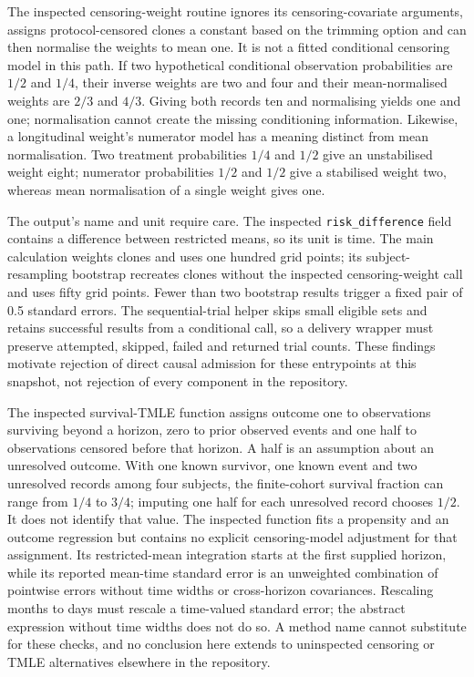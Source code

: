 The inspected censoring-weight routine ignores its censoring-covariate arguments,
assigns protocol-censored clones a constant based on the trimming option and can
then normalise the weights to mean one. It is not a fitted conditional censoring
model in this path. If two hypothetical conditional observation probabilities are
$1/2$ and $1/4$, their inverse weights are two and four and their mean-normalised
weights are $2/3$ and $4/3$. Giving both records ten and normalising yields one
and one; normalisation cannot create the missing conditioning information.
Likewise, a longitudinal weight's numerator model has a meaning distinct from mean
normalisation. Two treatment probabilities $1/4$ and $1/2$ give an unstabilised
weight eight; numerator probabilities $1/2$ and $1/2$ give a stabilised weight two,
whereas mean normalisation of a single weight gives one.
\citep{exec24_survivalother_rustcore,exec24_survivalother_reference}

The output's name and unit require care. The inspected
\texttt{risk\_difference} field contains a difference between restricted means,
so its unit is time. The main calculation weights clones and uses one hundred
grid points; its subject-resampling bootstrap recreates clones without the inspected
censoring-weight call and uses fifty grid points. Fewer than two bootstrap results
trigger a fixed pair of 0.5 standard errors. The sequential-trial helper skips
small eligible sets and retains successful results from a conditional call, so a
delivery wrapper must preserve attempted, skipped, failed and returned trial counts.
These findings motivate rejection of direct causal admission for these entrypoints
at this snapshot, not rejection of every component in the repository.
\citep{exec24_survivalother_rustcore}

The inspected survival-TMLE function assigns outcome one to observations surviving
beyond a horizon, zero to prior observed events and one half to observations censored
before that horizon. A half is an assumption about an unresolved outcome. With one
known survivor, one known event and two unresolved records among four subjects, the
finite-cohort survival fraction can range from $1/4$ to $3/4$; imputing one half for
each unresolved record chooses $1/2$. It does not identify that value. The inspected
function fits a propensity and an outcome regression but contains no explicit
censoring-model adjustment for that assignment. Its restricted-mean integration starts
at the first supplied horizon, while its reported mean-time standard error is an
unweighted combination of pointwise errors without time widths or cross-horizon
covariances. Rescaling months to days must rescale a time-valued standard error;
the abstract expression without time widths does not do so. A method name cannot
substitute for these checks, and no conclusion here extends to uninspected censoring
or TMLE alternatives elsewhere in the repository.
\citep{exec24_survivalother_rustcore,exec24_survivalother_reference}

